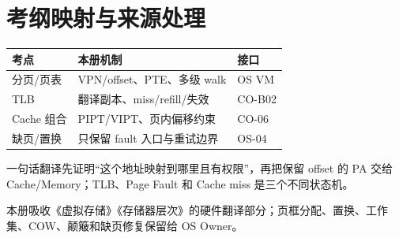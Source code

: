\documentclass[UTF8,fontset=fandol,11pt,a4paper]{ctexart}
\begin{document}
\section{考纲映射与来源处理}
\begin{center}\small\begin{tabularx}{\linewidth}{L{3.2cm}YY}\toprule
考点 & 本册机制 & 接口\\\midrule
分页/页表 & VPN/offset、PTE、多级 walk & OS VM\\
TLB & 翻译副本、miss/refill/失效 & CO-B02\\
Cache 组合 & PIPT/VIPT、页内偏移约束 & CO-06\\
缺页/置换 & 只保留 fault 入口与重试边界 & OS-04\\
\bottomrule\end{tabularx}\end{center}
\begin{corebox}{一句话}翻译先证明“这个地址映射到哪里且有权限”，再把保留 offset 的 PA 交给 Cache/Memory；TLB、Page Fault 和 Cache miss 是三个不同状态机。\end{corebox}
本册吸收《虚拟存储》《存储器层次》的硬件翻译部分；页框分配、置换、工作集、COW、颠簸和缺页修复保留给 OS Owner。
\end{document}
